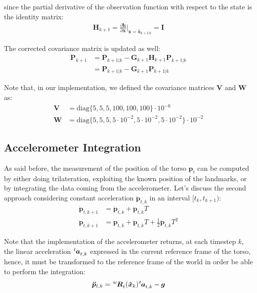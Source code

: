 \documentclass[a4paper]{article}
\newcommand{\at}[2][]{#1|_{#2}}
\begin{document}
\noindent since the partial derivative of the observation
function with respect to the state is the identity matrix:
\begin{align}
    \bm{H}_{k+1} = \frac{\partial \bm{h}}{\partial \bm{x}} \at[\bigg]{\bm{x}=\bm{\hat{x}}_{k+1|k}}
        = \bm{I}
\end{align}

The corrected covariance matrix is updated as well:
\begin{align}
    \bm{P}_{k+1} &= \bm{P}_{k+1|k} - \bm{G}_{k+1} \bm{H}_{k+1} \bm{P}_{k+1|k} \\
        &= \bm{P}_{k+1|k} - \bm{G}_{k+1} \bm{P}_{k+1|k}
\end{align}

Note that, in our implementation, we defined the covariance
matrices $\bm{V}$ and $\bm{W}$ as:
\begin{align}
    \bm{V} &= \text{diag}\{5, 5, 5, 100, 100, 100 \} \cdot 10^{-6} \\
    \bm{W} &= \text{diag}\{5, 5, 5, 5 \cdot 10^{-2}, 5 \cdot 10^{-2}, 5 \cdot 10^{-2} \}  \cdot 10^{-2}
\end{align}

\subsection{Accelerometer Integration}
\label{subsec:accelerometer-integration}

As said before, the measurement of the position of the torso $\bm{p}_t$ can be computed
by either doing trilateration, exploiting the known position of the landmarks, or
by integrating the data coming from the accelerometer. Let's discuss the second
approach considering constant acceleration $\bm{\ddot{p}}_{t, k}$ in an interval $[t_k, t_{k+1})$:
\begin{align}
    \label{eq:velocity-accelerometer-integration}
    \bm{\dot{p}}_{t, k+1} &= \bm{\dot{p}}_{t, k} + \bm{\ddot{p}}_{t, k} T \\
    \label{eq:position-accelerometer-integration}
    \bm{p}_{t, k+1} &= \bm{p}_{t, k} + \bm{\dot{p}}_{t, k} T + \frac{1}{2} \bm{\ddot{p}}_{t, k} T^2
\end{align}

Note that the implementation of the accelerometer returns, at each timestep $k$,
the linear acceleration $\tensor[^t]{\bm{a}}{_{t,k}}$ expressed in the
current reference frame of the torso, hence, it must be transformed to the
reference frame of the world in order be able to perform the integration:
\begin{equation}
    \bm{\ddot{p}}_{t,k} = \tensor[^w]{\bm{R}}{_t}(\bm{\hat{x}}_{k}) \tensor[^t]{\bm{a}}{_{t,k}} - \bm{g}
\end{equation}
\end{document}
